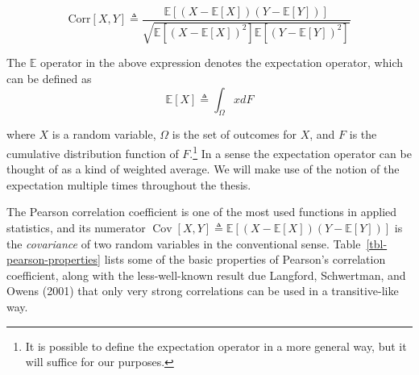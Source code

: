 \documentclass[
  letterpaper,
  DIV=11,
  numbers=noendperiod]{scrreprt}
\begin{document}
\begin{equation}
\text{Corr}\left[ X, Y\right] \triangleq \frac{\mathbb{E}\left[ \left( X - \mathbb{E}\left[ X \right] \right) \left( Y - \mathbb{E}\left[ Y \right] \right) \right]}{\sqrt{\mathbb{E}\left[\left( X - \mathbb{E}\left[ X \right] \right)^2 \right] \mathbb{E}\left[\left( Y - \mathbb{E}\left[ Y \right] \right)^2 \right]}}
\end{equation}

The \(\mathbb{E}\) operator in the above expression denotes the
expectation operator, which can be defined as
\[\mathbb{E}[X] \triangleq \int_{\Omega} x dF\]

where \(X\) is a random variable, \(\Omega\) is the set of outcomes for
\(X\), and \(F\) is the cumulative distribution function of
\(F\).\footnote{It is possible to define the expectation operator in a more general way, but it will suffice for our purposes.}
In a sense the expectation operator can be thought of as a kind of
weighted average. We will make use of the notion of the expectation
multiple times throughout the thesis.

The Pearson correlation coefficient is one of the most used functions in
applied statistics, and its numerator
\(\operatorname{Cov}[X,Y] \triangleq \mathbb{E}\left[ \left( X - \mathbb{E}\left[ X \right] \right) \left( Y - \mathbb{E}\left[ Y \right] \right) \right]\)
is the \textit{covariance} of two random variables in the conventional
sense. Table~\ref{tbl-pearson-properties} lists some of the basic
properties of Pearson's correlation coefficient, along with the
less-well-known result due Langford, Schwertman, and Owens (2001) that
only very strong correlations can be used in a transitive-like way.
\end{document}

